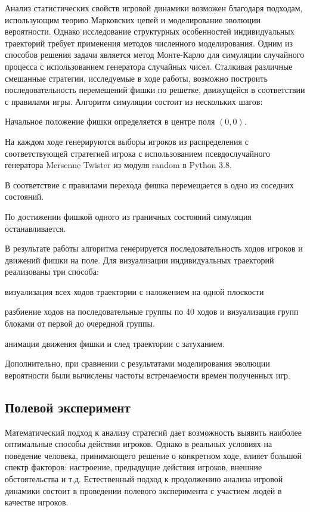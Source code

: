 Анализ статистических свойств игровой динамики возможен благодаря подходам, использующим теорию Марковских цепей
и моделирование эволюции вероятности. Однако исследование структурных особенностей индивидуальных траекторий 
требует применения методов численного моделирования. Одним из способов решения задачи является метод Монте-Карло
для симуляции случайного процесса с использованием генератора случайных чисел. Сталкивая различные смешанные стратегии,
исследуемые в ходе работы, возможно построить последовательность перемещений фишки по решетке, движущейся в соответствии
с правилами игры. Алгоритм симуляции состоит из нескольких шагов:

\item Начальное положение фишки определяется в центре поля $(0, 0)$. 
\item На каждом ходе генерируются выборы игроков из распределения с соответствующей стратегией игрока
с использованием псевдослучайного генератора Mersenne Twister из модуля random в Python 3.8.
\item В соответствие с правилами перехода фишка перемещается в одно из соседних состояний.
\item По достижении фишкой одного из граничных состояний симуляция останавливается.

В результате работы алгоритма генерируется последовательность ходов игроков и движений фишки на поле.
Для визуализации индивидуальных траекторий реализованы три способа: 
\item визуализация всех ходов траектории с наложением на одной плоскости
\item разбиение ходов на последовательные группы по 40 ходов и визуализация групп блоками от первой до очередной группы.
\item анимация движения фишки и след траектории с затуханием.

Дополнительно, при сравнении с результатами моделирования эволюции вероятности были вычислены частоты
встречаемости времен полученных игр. 

\subsection{Полевой эксперимент}\label{subsec:ch1/sec3/sub6}

Математический подход к анализу стратегий дает возможность выявить наиболее оптимальные 
способы действия игроков. Однако в реальных условиях на поведение человека, принимающего решение
о конкретном ходе, влияет большой спектр факторов: настроение, предыдущие действия игроков, внешние обстоятельства и т.д.
Естественный подход к продолжению анализа игровой динамики состоит в проведении полевого эксперимента
с участием людей в качестве игроков. 


